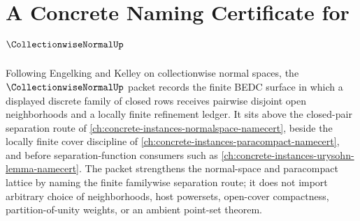 \chapter{A Concrete Naming Certificate for $\CollectionwiseNormalUp$}
\label{ch:concrete-instances-collectionwise-normal-namecert}

Following Engelking and Kelley on collectionwise normal spaces, the $\CollectionwiseNormalUp$ packet records the finite BEDC surface in which a displayed discrete family of closed rows receives pairwise disjoint open neighborhoods and a locally finite refinement ledger. It sits above the closed-pair separation route of \autoref{ch:concrete-instances-normalspace-namecert}, beside the locally finite cover discipline of \autoref{ch:concrete-instances-paracompact-namecert}, and before separation-function consumers such as \autoref{ch:concrete-instances-urysohn-lemma-namecert}. The packet strengthens the normal-space and paracompact lattice by naming the finite familywise separation route; it does not import arbitrary choice of neighborhoods, host powersets, open-cover compactness, partition-of-unity weights, or an ambient point-set theorem.


